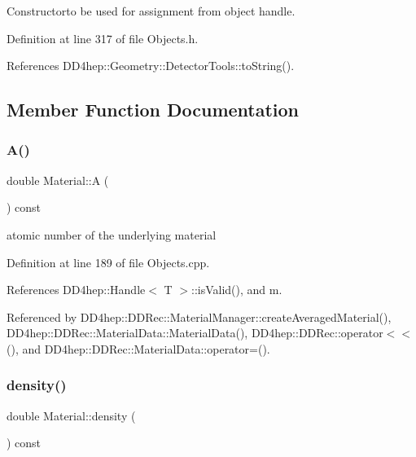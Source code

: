 Constructorto be used for assignment from object handle. 



Definition at line 317 of file Objects.\+h.



References D\+D4hep\+::\+Geometry\+::\+Detector\+Tools\+::to\+String().



\subsection{Member Function Documentation}
\hypertarget{class_d_d4hep_1_1_geometry_1_1_material_a48a7eedb2bf1e255252a3d212b29dfd0}{}\label{class_d_d4hep_1_1_geometry_1_1_material_a48a7eedb2bf1e255252a3d212b29dfd0} 
\subsubsection{\texorpdfstring{A()}{A()}}
{\footnotesize\ttfamily double Material\+::A (\begin{DoxyParamCaption}{ }\end{DoxyParamCaption}) const}



atomic number of the underlying material 



Definition at line 189 of file Objects.\+cpp.



References D\+D4hep\+::\+Handle$<$ T $>$\+::is\+Valid(), and m.



Referenced by D\+D4hep\+::\+D\+D\+Rec\+::\+Material\+Manager\+::create\+Averaged\+Material(), D\+D4hep\+::\+D\+D\+Rec\+::\+Material\+Data\+::\+Material\+Data(), D\+D4hep\+::\+D\+D\+Rec\+::operator$<$$<$(), and D\+D4hep\+::\+D\+D\+Rec\+::\+Material\+Data\+::operator=().

\hypertarget{class_d_d4hep_1_1_geometry_1_1_material_a68cdabad1dae26341a4690de2464ee43}{}\label{class_d_d4hep_1_1_geometry_1_1_material_a68cdabad1dae26341a4690de2464ee43} 
\subsubsection{\texorpdfstring{density()}{density()}}
{\footnotesize\ttfamily double Material\+::density (\begin{DoxyParamCaption}{ }\end{DoxyParamCaption}) const}



